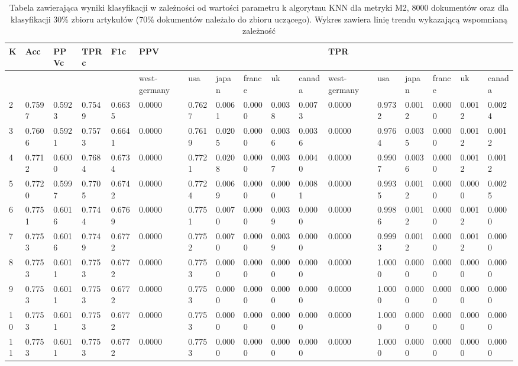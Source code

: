 \documentclass{classrep}
\begin{document}
\begin{table}[!htbp]
    \centering
\caption{Tabela zawierająca wyniki klasyfikacji w zależności od wartości parametru k algorytmu KNN dla metryki M2, 8000 dokumentów oraz dla klasyfikacji 30\% zbioru artykułów (70\% dokumentów należało do zbioru uczącego). Wykres zawiera linię trendu wykazającą wspomnianą zależność}
\begin{adjustbox}{max width=\textwidth}
    \begin{tabular}{|l|l|l|l|l|l|l|l|l|l|l|l|l|l|l|l|l|}
    \hline
        K & Acc & PPVc & TPRc & F1c & PPV & ~ & ~ & ~ & ~ & ~ & TPR & ~ & ~ & ~ & ~ & ~ \\ \hline
        ~ & ~ & ~ & ~ & ~ & west-germany  & usa  & japan & france & uk & canada & west-germany  & usa  & japan & france & uk & canada \\ \hline
        2 & 0.7597 & 0.5923 & 0.7549 & 0.6635 & 0.0000 & 0.7627 & 0.0061 & 0.0000 & 0.0038 & 0.0073 & 0.0000 & 0.9732 & 0.0012 & 0.0000 & 0.0012 & 0.0024 \\ \hline
        3 & 0.7606 & 0.5921 & 0.7573 & 0.6641 & 0.0000 & 0.7619 & 0.0205 & 0.0000 & 0.0036 & 0.0036 & 0.0000 & 0.9764 & 0.0035 & 0.0000 & 0.0012 & 0.0012 \\ \hline
        4 & 0.7712 & 0.6000 & 0.7684 & 0.6734 & 0.0000 & 0.7721 & 0.0208 & 0.0000 & 0.0037 & 0.0040 & 0.0000 & 0.9907 & 0.0036 & 0.0000 & 0.0012 & 0.0012 \\ \hline
        5 & 0.7720 & 0.5997 & 0.7705 & 0.6742 & 0.0000 & 0.7724 & 0.0069 & 0.0000 & 0.0000 & 0.0081 & 0.0000 & 0.9935 & 0.0012 & 0.0000 & 0.0000 & 0.0025 \\ \hline
        6 & 0.7751 & 0.6016 & 0.7744 & 0.6769 & 0.0000 & 0.7751 & 0.0070 & 0.0000 & 0.0039 & 0.0000 & 0.0000 & 0.9986 & 0.0012 & 0.0000 & 0.0012 & 0.0000 \\ \hline
        7 & 0.7753 & 0.6016 & 0.7749 & 0.6772 & 0.0000 & 0.7752 & 0.0070 & 0.0000 & 0.0039 & 0.0000 & 0.0000 & 0.9993 & 0.0012 & 0.0000 & 0.0012 & 0.0000 \\ \hline
        8 & 0.7753 & 0.6011 & 0.7753 & 0.6772 & 0.0000 & 0.7753 & 0.0000 & 0.0000 & 0.0000 & 0.0000 & 0.0000 & 1.0000 & 0.0000 & 0.0000 & 0.0000 & 0.0000 \\ \hline
        9 & 0.7753 & 0.6011 & 0.7753 & 0.6772 & 0.0000 & 0.7753 & 0.0000 & 0.0000 & 0.0000 & 0.0000 & 0.0000 & 1.0000 & 0.0000 & 0.0000 & 0.0000 & 0.0000 \\ \hline
        10 & 0.7753 & 0.6011 & 0.7753 & 0.6772 & 0.0000 & 0.7753 & 0.0000 & 0.0000 & 0.0000 & 0.0000 & 0.0000 & 1.0000 & 0.0000 & 0.0000 & 0.0000 & 0.0000 \\ \hline
        11 & 0.7753 & 0.6011 & 0.7753 & 0.6772 & 0.0000 & 0.7753 & 0.0000 & 0.0000 & 0.0000 & 0.0000 & 0.0000 & 1.0000 & 0.0000 & 0.0000 & 0.0000 & 0.0000 \\ \hline
    \end{tabular}
\end{adjustbox}
\end{table}
\end{document}
